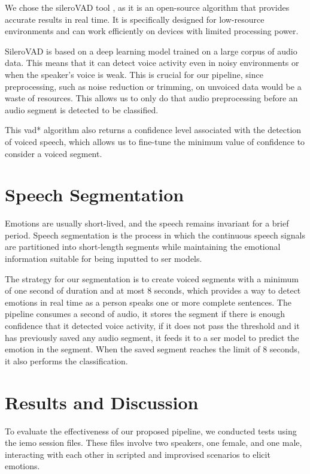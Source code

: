 We chose the sileroVAD tool \cite{SileroVAD}, as it is an open-source algorithm that provides accurate results in real time. It is specifically designed for low-resource environments and can work efficiently on devices with limited processing power.

SileroVAD is based on a deep learning model trained on a large corpus of audio data. This means that it can detect voice activity even in noisy environments or when the speaker's voice is weak. This is crucial for our pipeline, since preprocessing, such as noise reduction or trimming, on unvoiced data would be a waste of resources. This allows us to only do that audio preprocessing before an audio segment is detected to be classified.

This \ac{vad*} algorithm also returns a confidence level associated with the detection of voiced speech, which allows us to fine-tune the minimum value of confidence to consider a voiced segment.

\section{Speech Segmentation}

Emotions are usually short-lived, and the speech remains invariant for a brief period. Speech segmentation is the process in which the continuous speech signals are partitioned into short-length segments while maintaining the emotional information suitable for being inputted to \ac{ser} models.

The strategy for our segmentation is to create voiced segments with a minimum of one second of duration and at most 8 seconds, which provides a way to detect emotions in real time as a person speaks one or more complete sentences. The pipeline consumes a second of audio, it stores the segment if there is enough confidence that it detected voice activity, if it does not pass the threshold and it has previously saved any audio segment, it feeds it to a \ac{ser} model to predict the emotion in the segment. When the saved segment reaches the limit of 8 seconds, it also performs the classification.


\section{Results and Discussion}

To evaluate the effectiveness of our proposed pipeline, we conducted tests using the \ac{iemo} session files. These files involve two speakers, one female, and one male, interacting with each other in scripted and improvised scenarios to elicit emotions.

